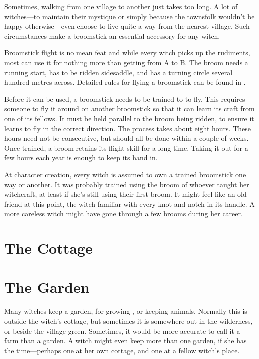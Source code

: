 Sometimes, walking from one village to another just takes too long.
A lot of witches---to maintain their mystique or simply because the townsfolk wouldn't be happy otherwise---even choose to live quite a way from the nearest village.
Such circumstances make a broomstick an essential accessory for any witch.

Broomstick flight is no mean feat and while every witch picks up the rudiments, most can use it for nothing more than getting from A to B.
The broom needs a running start, has to be ridden sidesaddle, and has a turning circle several hundred metres across.
Detailed rules for flying a broomstick can be found in .

Before it can be used, a broomstick needs to be trained to to fly.
This requires someone to fly it around on another broomstick so that it can learn its craft from one of its fellows.
It must be held parallel to the broom being ridden, to ensure it learns to fly in the correct direction.
The process takes about eight hours.
These hours need not be consecutive, but should all be done within a couple of weeks.
Once trained, a broom retains its flight skill for a long time.
Taking it out for a few hours each year is enough to keep its hand in.

At character creation, every witch is assumed to own a trained broomstick one way or another.
It was probably trained using the broom of whoever taught her witchcraft, at least if she's still using their first broom.
It might feel like an old friend at this point, the witch familiar with every knot and notch in its handle.
A more careless witch might have gone through a few brooms during her career.



\section{The Cottage}

\section{The Garden}

Many witches keep a garden, for growing , or keeping animals.
Normally this is outside the witch's cottage, but sometimes it is somewhere out in the wilderness, or beside the village green.
Sometimes, it would be more accurate to call it a farm than a garden.
A witch might even keep more than one garden, if she has the time---perhaps one at her own cottage, and one at a fellow witch's place.

